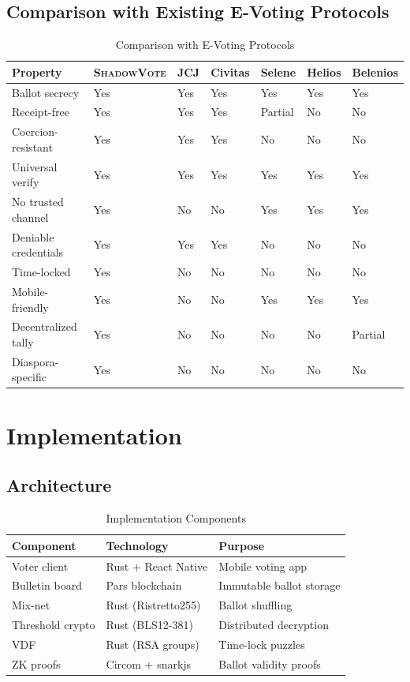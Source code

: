 \documentclass[11pt,a4paper]{article}
\newcommand{\shadow}{\textsc{ShadowVote}\xspace}
\begin{document}
\subsection{Comparison with Existing E-Voting Protocols}

\begin{table}[H]
\centering
\caption{Comparison with E-Voting Protocols}
\label{tab:evote-compare}
\begin{tabularx}{\textwidth}{lXXXXXX}
\toprule
\textbf{Property} & \textbf{\shadow} & \textbf{JCJ} & \textbf{Civitas} & \textbf{Selene} & \textbf{Helios} & \textbf{Belenios} \\
\midrule
Ballot secrecy & Yes & Yes & Yes & Yes & Yes & Yes \\
Receipt-free & Yes & Yes & Yes & Partial & No & No \\
Coercion-resistant & Yes & Yes & Yes & No & No & No \\
Universal verify & Yes & Yes & Yes & Yes & Yes & Yes \\
No trusted channel & Yes & No & No & Yes & Yes & Yes \\
Deniable credentials & Yes & Yes & Yes & No & No & No \\
Time-locked & Yes & No & No & No & No & No \\
Mobile-friendly & Yes & No & No & Yes & Yes & Yes \\
Decentralized tally & Yes & No & No & No & No & Partial \\
Diaspora-specific & Yes & No & No & No & No & No \\
\bottomrule
\end{tabularx}
\end{table}

\section{Implementation}

\subsection{Architecture}

\begin{table}[H]
\centering
\caption{Implementation Components}
\label{tab:impl}
\begin{tabular}{lll}
\toprule
\textbf{Component} & \textbf{Technology} & \textbf{Purpose} \\
\midrule
Voter client & Rust + React Native & Mobile voting app \\
Bulletin board & Pars blockchain & Immutable ballot storage \\
Mix-net & Rust (Ristretto255) & Ballot shuffling \\
Threshold crypto & Rust (BLS12-381) & Distributed decryption \\
VDF & Rust (RSA groups) & Time-lock puzzles \\
ZK proofs & Circom + snarkjs & Ballot validity proofs \\
\bottomrule
\end{tabular}
\end{table}
\end{document}
